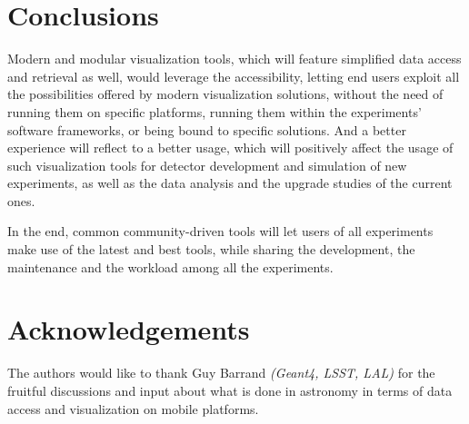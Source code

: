 \documentclass[12pt,a4paper]{article}
\begin{document}
\hypertarget{conclusions}{%
\section{Conclusions}\label{conclusions}}

Modern and modular visualization tools, which will feature simplified data access and retrieval as well, would leverage
the accessibility, letting end users exploit all the possibilities offered by modern visualization solutions, without the need
of running them on specific platforms, running them within the experiments’ software frameworks, or being bound to specific solutions.
And a better experience will reflect to a better usage, which will positively affect the usage of such visualization tools for
detector development and simulation of new experiments, as well as the data analysis and the upgrade studies of the current ones.

In the end, common community-driven tools will let users of all experiments make use of the latest and best tools, while sharing the development,
the maintenance and the workload among all the experiments.

\hypertarget{acknowledgements}{%
\section{Acknowledgements}\label{acknowledgements}}

The authors would like to thank Guy Barrand \textit{(Geant4, LSST, LAL)} for the fruitful discussions and input about what is done in astronomy in terms of data access and visualization on mobile platforms.




\sloppy
\raggedright
\clearpage
\printbibliography[title={References},heading=bibintoc]
\end{document}
